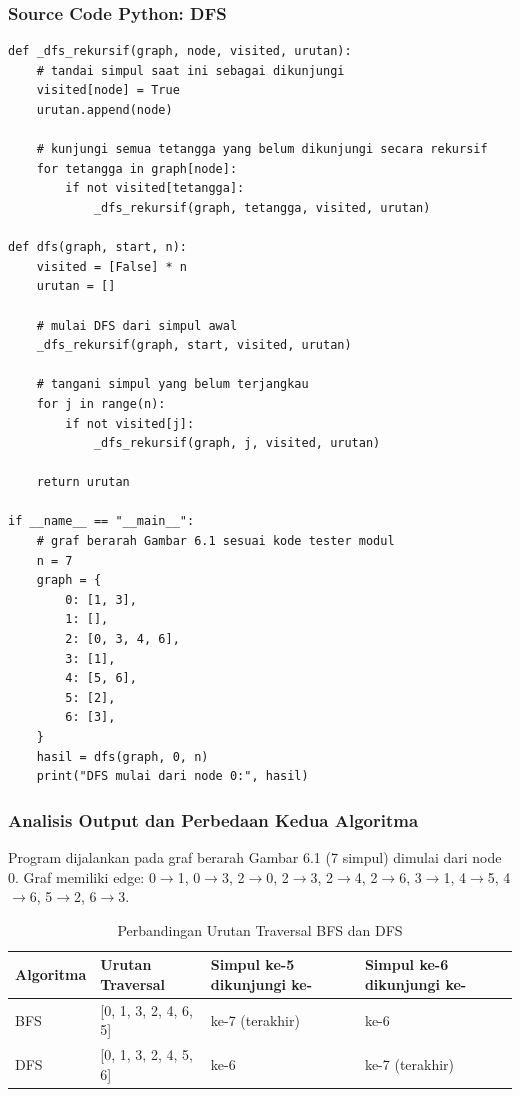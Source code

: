 \subsubsection*{Source Code Python: DFS}
\begin{lstlisting}[basicstyle=\ttfamily\scriptsize, frame=single, backgroundcolor=\color{white}, numbers=none, keywordstyle=\color{black}, commentstyle=\color{black}, stringstyle=\color{black}, breaklines=true]
def _dfs_rekursif(graph, node, visited, urutan):
    # tandai simpul saat ini sebagai dikunjungi
    visited[node] = True
    urutan.append(node)
    
    # kunjungi semua tetangga yang belum dikunjungi secara rekursif
    for tetangga in graph[node]:
        if not visited[tetangga]:
            _dfs_rekursif(graph, tetangga, visited, urutan)

def dfs(graph, start, n):
    visited = [False] * n
    urutan = []
    
    # mulai DFS dari simpul awal
    _dfs_rekursif(graph, start, visited, urutan)
    
    # tangani simpul yang belum terjangkau
    for j in range(n):
        if not visited[j]:
            _dfs_rekursif(graph, j, visited, urutan)
            
    return urutan

if __name__ == "__main__":
    # graf berarah Gambar 6.1 sesuai kode tester modul
    n = 7
    graph = {
        0: [1, 3],
        1: [],
        2: [0, 3, 4, 6],
        3: [1],
        4: [5, 6],
        5: [2],
        6: [3],
    }
    hasil = dfs(graph, 0, n)
    print("DFS mulai dari node 0:", hasil)
\end{lstlisting}

\subsubsection*{Analisis Output dan Perbedaan Kedua Algoritma}
Program dijalankan pada graf berarah Gambar 6.1 (7 simpul) dimulai dari node 0. Graf memiliki edge: 0$\rightarrow$1, 0$\rightarrow$3, 2$\rightarrow$0, 2$\rightarrow$3, 2$\rightarrow$4, 2$\rightarrow$6, 3$\rightarrow$1, 4$\rightarrow$5, 4$\rightarrow$6, 5$\rightarrow$2, 6$\rightarrow$3.

\begin{table}[H]
    \centering
    \caption{Perbandingan Urutan Traversal BFS dan DFS}
    \begin{tabular}{llp{3cm}p{3cm}}
    \toprule
    \textbf{Algoritma} & \textbf{Urutan Traversal} & \textbf{Simpul ke-5 dikunjungi ke-} & \textbf{Simpul ke-6 dikunjungi ke-} \\ \midrule
    BFS & [0, 1, 3, 2, 4, 6, 5] & ke-7 (terakhir) & ke-6 \\
    DFS & [0, 1, 3, 2, 4, 5, 6] & ke-6 & ke-7 (terakhir) \\ \bottomrule
    \end{tabular}
\end{table}

